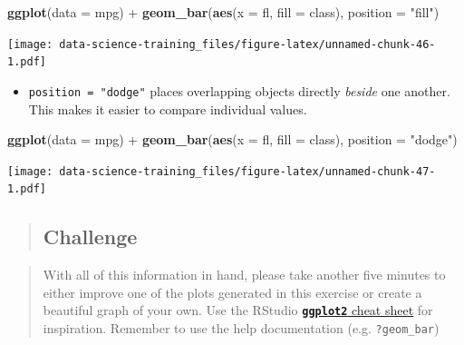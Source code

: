 \documentclass[]{book}
\newenvironment{Shaded}{\begin{snugshade}}{\end{snugshade}}
\newcommand{\KeywordTok}[1]{\textcolor[rgb]{0.13,0.29,0.53}{\textbf{{#1}}}}
\newcommand{\DataTypeTok}[1]{\textcolor[rgb]{0.13,0.29,0.53}{{#1}}}
\newcommand{\StringTok}[1]{\textcolor[rgb]{0.31,0.60,0.02}{{#1}}}
\newcommand{\NormalTok}[1]{{#1}}
\providecommand{\tightlist}{%
  \setlength{\itemsep}{0pt}\setlength{\parskip}{0pt}}
\theoremstyle{definition}
\theoremstyle{definition}
\theoremstyle{definition}
\theoremstyle{remark}
\begin{document}
\begin{Shaded}
\begin{Highlighting}[]
    \KeywordTok{ggplot}\NormalTok{(}\DataTypeTok{data =} \NormalTok{mpg) +}\StringTok{ }
\StringTok{      }\KeywordTok{geom_bar}\NormalTok{(}\KeywordTok{aes}\NormalTok{(}\DataTypeTok{x =} \NormalTok{fl, }\DataTypeTok{fill =} \NormalTok{class), }\DataTypeTok{position =} \StringTok{"fill"}\NormalTok{)}
\end{Highlighting}
\end{Shaded}

\texttt{[image: data-science-training\_files/figure-latex/unnamed-chunk-46-1.pdf]}

\begin{itemize}
\tightlist
\item
  \texttt{position\ =\ "dodge"} places overlapping objects directly
  \emph{beside} one another. This makes it easier to compare individual
  values.
\end{itemize}

\begin{Shaded}
\begin{Highlighting}[]
    \KeywordTok{ggplot}\NormalTok{(}\DataTypeTok{data =} \NormalTok{mpg) +}\StringTok{ }
\StringTok{      }\KeywordTok{geom_bar}\NormalTok{(}\KeywordTok{aes}\NormalTok{(}\DataTypeTok{x =} \NormalTok{fl, }\DataTypeTok{fill =} \NormalTok{class), }\DataTypeTok{position =} \StringTok{"dodge"}\NormalTok{) }
\end{Highlighting}
\end{Shaded}

\texttt{[image: data-science-training\_files/figure-latex/unnamed-chunk-47-1.pdf]}

\begin{quote}
\subsection{Challenge}\label{challenge-1}
\end{quote}

\begin{quote}
With all of this information in hand, please take another five minutes
to either improve one of the plots generated in this exercise or create
a beautiful graph of your own. Use the RStudio
\href{https://www.rstudio.com/wp-content/uploads/2016/11/ggplot2-cheatsheet-2.1.pdf}{\textbf{\texttt{ggplot2}}
cheat sheet} for inspiration. Remember to use the help documentation
(e.g. \texttt{?geom\_bar})
\end{quote}
\end{document}
